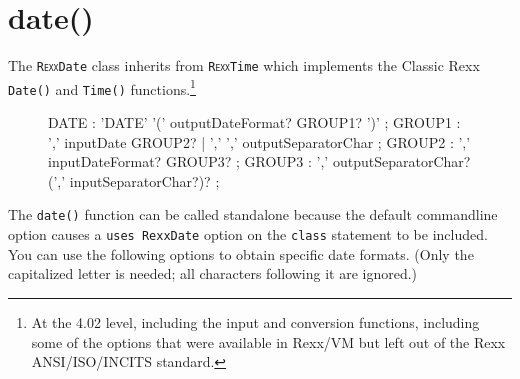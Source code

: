\section{date()}\label{refrexxdate}
 
The \texttt{R\textsc{exx}Date} class inherits from
\texttt{R\textsc{exx}Time} which implements the Classic
Rexx \texttt{Date()} and \texttt{Time()} functions.\footnote{At the
  4.02 level, including the input and conversion functions, including
some of the options that were available in Rexx/VM but left out of the
Rexx ANSI/ISO/INCITS standard.}

\begin{figure}[h]
  \begin{shaded}
\begin{rail}
  DATE : 'DATE' '('   outputDateFormat? GROUP1?  ')'
  ;
  GROUP1 : ','  inputDate GROUP2?
  | ','  ','  outputSeparatorChar
  ;
  GROUP2 : ','  inputDateFormat? GROUP3?
  ;
  GROUP3 : ','  outputSeparatorChar? (',' inputSeparatorChar?)?
  ;
  
\end{rail}
\end{shaded}
\end{figure}

The \texttt{date()} function can be called standalone because the
default commandline option  causes a \texttt{uses RexxDate}
option on the \texttt{class} statement to be included. You can use the following options to obtain specific date formats. (Only the capitalized letter is needed; all characters following it are ignored.)
